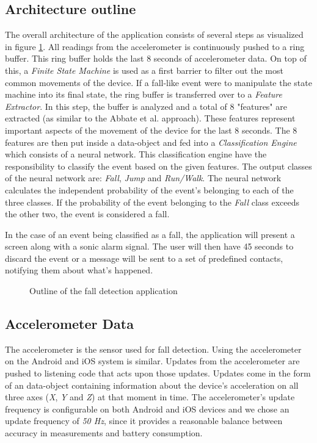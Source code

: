 \documentclass[12pt, a4paper, onecolumn]{article}
\begin{document}
	\subsection{Architecture outline}
	The overall architecture of the application consists of several steps as visualized in figure \ref{fig:arch-outline}. All readings from the accelerometer is continuously pushed to a ring buffer.	This ring buffer holds the last 8 seconds of accelerometer data. On top of this, a \textit{Finite State Machine} is used as a first barrier to filter out the most common movements of the device. If a fall-like event were to manipulate the state machine into its final state, the ring buffer is transferred over to a \textit{Feature Extractor}. In this step, the buffer is analyzed and a total of 8 "features" are extracted (as similar to the Abbate et al. approach). These features represent important aspects of the movement of the device for the last 8 seconds. The 8 features are then put inside a data-object and fed into a \textit{Classification Engine} which consists of a neural network. This classification engine have the responsibility to classify the event based on the given features. The output classes of the neural network are: \textit{Fall}, \textit{Jump} and \textit{Run/Walk}. The neural network calculates the independent probability of the event's belonging to each of the three classes. If the probability of the event belonging to the \textit{Fall} class exceeds the other two, the event is considered a fall. 
	
	In the case of an event being classified as a fall, the application will present a screen along with a sonic alarm signal. The user will then have 45 seconds to discard the event or a message will be sent to a set of predefined contacts, notifying them about what's happened.
	
	\begin{figure}[H]
		\centering
		\caption{Outline of the fall detection application}%
		\label{fig:arch-outline}%
	\end{figure}
	
	\subsection{Accelerometer Data}
	The accelerometer is the sensor used for fall detection. Using the accelerometer on the Android and iOS system is similar. Updates from the accelerometer are pushed to listening code that acts upon those updates. Updates come in the form of an data-object containing information about the device's acceleration on all three axes (\textit{X}, \textit{Y} and \textit{Z}) at that moment in time. The accelerometer's update frequency is configurable on both Android and iOS devices and we chose an update frequency of \textit{50 Hz}, since it provides a reasonable balance between accuracy in measurements and battery consumption. 
	
\end{document}
